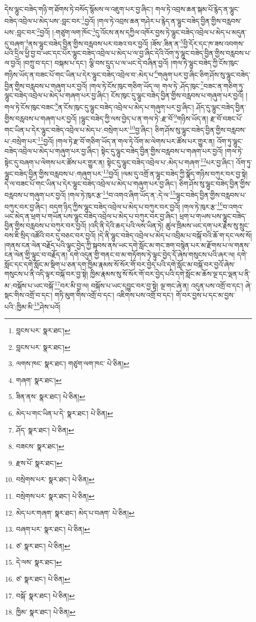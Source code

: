 དེས་ལྷུང་བཟེད་གཉི་ག་ཐོགས་ཏེ་བསོད་སྙོམས་ལ་འཇུག་པར་བྱ་ཞིང་། གལ་ཏེ་འབྲས་ཆན་སྐམ་པོ་རྙེད་ན་ལྷུང་བཟེད་འབྲེལ་པ་མེད་པས་:བླང་བར་\footnote{བླངས་པར་  སྣར་ཐང་། }བྱའོ། །གལ་ཏེ་འབྲས་ཆན་གཤེར་པ་རྙེད་ན་ལྷུང་བཟེད་བྱིན་གྱིས་བརླབས་པས་:བླང་བར་\footnote{བླངས་པར་  སྣར་ཐང་། }བྱའོ། །:གཙུག་ལག་ཁོང་\footnote{ལགས་ཁང་  སྣར་ཐང་། གཙུག་ལག་ཁང་  པེ་ཅིན། }དུ་འོངས་ནས་དཀྱིལ་འཁོར་བྱས་ཏེ་ལྷུང་བཟེད་འབྲེལ་པ་མེད་པ་མདུན་དུ་བཞག་\footnote{གཞག་  སྣར་ཐང་། }ནས་ལྷུང་བཟེད་བྱིན་གྱིས་བརླབས་པར་བཟའ་བར་བྱའོ། །ཟོས་:ཟིན་ན་\footnote{ཟིན་ནས་  སྣར་ཐང་།  པེ་ཅིན། }བྱི་དོར་དང་ཁ་ཟས་འབགས་པའི་དྲིལ་ཕྱི་བྱ་བ་ཡང་དང་པོར་ལྷུང་བཟེད་འབྲེལ་པ་མེད་པ་ལ་བྱ་ཞིང་དེའི་འོག་ཏུ་ལྷུང་བཟེད་བྱིན་གྱིས་བརླབས་པ་ལ་བྱའོ། །བཀྲུ་བ་དང་། བསྐམ་པ་དང་། ལྕི་བས་དྲུད་པ་ལ་ཡང་དེ་བཞིན་བྱའོ། །གལ་ཏེ་ལྷུང་བཟེད་ཀྱི་ངོས་ཁུང་གཉིས་ཡོད་ན་བཟང་པོ་གང་ཡིན་པ་དེར་ལྷུང་བཟེད་འབྲེལ་བ་:མེད་པ་\footnote{མེད་པ་གང་ཡིན་པ་དེ་  སྣར་ཐང་།  པེ་ཅིན། }གཞུག་པར་བྱ་ཞིང་ཅིག་ཤོས་སུ་ལྷུང་བཟེད་བྱིན་གྱིས་བརླབས་པ་གཞུག་པར་བྱའོ། །གལ་ཏེ་ངོས་ཁུང་གཅིག་ཡོད་ལ། གལ་ཏེ་:ཤོད་ཁུང་\footnote{ཤོད་  སྣར་ཐང་།  པེ་ཅིན། }བཟང་ན་གཅིག་ཏུ་ལྷུང་བཟེད་འབྲེལ་པ་མེད་པ་གཞག་པར་བྱ་ཞིང་། ངོས་ཁུང་དུ་ལྷུང་བཟེད་བྱིན་གྱིས་བརླབས་པ་གཞུག་པར་བྱའོ། །གལ་ཏེ་ངོས་ཁུང་བཟང་\footnote{བཟངས་  སྣར་ཐང་། }ན་ངོས་ཁུང་དུ་ལྷུང་བཟེད་འབྲེལ་པ་མེད་པ་གཞུག་པར་བྱ་ཞིང་། ཤོད་དུ་ལྷུང་བཟེད་བྱིན་གྱིས་བརླབས་པ་གཞག་པར་བྱའོ། །ལྷུང་བཟེད་ཀྱི་ལས་བྱེད་པ་ན་གལ་ཏེ་:རྫ་བོ་\footnote{རྫས་པོ་  སྣར་ཐང་། }གཉིས་ཡོད་ན། རྫ་བོ་བཟང་པོ་གང་ཡིན་པ་དེར་ལྷུང་བཟེད་འབྲེལ་པ་མེད་པ་:བསྲེག་པར་\footnote{བསྲེགས་པར་  སྣར་ཐང་།  པེ་ཅིན། }བྱ་ཞིང་། ཅིག་ཤོས་སུ་ལྷུང་བཟེད་བྱིན་གྱིས་བརླབས་པ་:བསྲེག་པར་\footnote{བསྲེགས་པར་  སྣར་ཐང་།  པེ་ཅིན། }བྱའོ། །གལ་ཏེ་རྫ་བོ་གཅིག་ཡོད་ན་གལ་ཏེ་འོག་མ་ལེགས་པར་ཚོས་པར་གྱུར་ན། འོག་ཏུ་ལྷུང་བཟེད་འབྲེལ་པ་མེད་པ་གཞུག་པར་བྱ་ཞིང་། སྟེང་དུ་ལྷུང་བཟེད་བྱིན་གྱིས་བརླབས་པ་གཞག་པར་བྱའོ། །གལ་ཏེ་སྟེང་དུ་བཞག་པ་ལེགས་པར་ཚོས་པར་གྱུར་ན། སྟེང་དུ་ལྷུང་བཟེད་འབྲེལ་པ་:མེད་པ་གཞག་\footnote{མེད་པར་གཞག་  སྣར་ཐང་། མེད་པ་བཞག་  པེ་ཅིན། }པར་བྱ་ཞིང་། འོག་ཏུ་ལྷུང་བཟེད་བྱིན་གྱིས་བརླབས་པ་:གཞུག་པར་\footnote{བཞག་པར་  སྣར་ཐང་།  པེ་ཅིན། }བྱའོ། །ལམ་དུ་འགྲོ་ན་ལྷུང་བཟེད་ཀྱི་སྣོད་གཉིས་བཀུར་བར་བྱ་སྟེ། དེ་ལ་བཟང་པོ་གང་ཡིན་པ་དེར་ལྷུང་བཟེད་འབྲེལ་པ་མེད་པ་གཞུག་པར་བྱ་ཞིང་། ཅིག་ཤོས་སུ་ལྷུང་བཟེད་བྱིན་གྱིས་བརླབས་པ་གཞུག་པར་བྱའོ། །གལ་ཏེ་ཁུར་རྩ་\footnote{ཙ་  སྣར་ཐང་།  པེ་ཅིན། }བ་འགའ་ཞིག་ཡོད་ན་:དེ་ལ་\footnote{དེ་ལས་  སྣར་ཐང་། }ལྷུང་བཟེད་བྱིན་གྱིས་བརླབས་པ་བཀུར་བར་བྱ་ཞིང་། བདག་ཉིད་ཀྱིས་ལྷུང་བཟེད་འབྲེལ་པ་མེད་པ་བཀུར་བར་བྱའོ། །གལ་ཏེ་ཁུར་རྩ་\footnote{ཙ་  སྣར་ཐང་།  པེ་ཅིན། }བ་འགའ་ཡང་མེད་ན་ཕྲག་པ་གཡོན་པས་ལྷུང་བཟེད་འབྲེལ་པ་མེད་པ་བཀུར་བར་བྱ་ཞིང་། ཕྲག་པ་གཡས་པས་ལྷུང་བཟེད་བྱིན་གྱིས་བརླབས་པ་བཀུར་བར་བྱའོ། །འདི་ནི་དེའི་ཆད་པའི་ལས་ཡིན་ཏེ། ཚུལ་ཁྲིམས་ཡང་དག་པར་རྗེས་སུ་སྲུང་བས་ཇི་སྲིད་འཚོའི་བར་དུ་བཅང་བར་བྱའོ། །དེ་ནི་ལྷུང་བཟེད་འབྲེལ་པ་མེད་པ་འབྲིམ་པ་བསྐོ་བའི་ཆོ་ག་དང་ལས་སོ། །གནས་ངན་ལེན་བརྗོད་པའི་ལྟུང་བྱེད་ཀྱི་སྐབས་ནས་ཡང་དགེ་སློང་མ་གང་ཟག་བསྙེན་པར་མ་རྫོགས་པ་ལ་གནས་ངན་ལེན་གྱི་ལྟུང་བ་བརྗོད་ན། དགེ་འདུན་གྱི་གནང་བ་མ་གཏོགས་ཏེ་ལྟུང་བྱེད་དོ་ཞེས་གསུངས་པའི་ཞར་ལ། དགེ་སློང་དང་དགེ་སློང་མ་སྡིག་པ་ཅན་དག་ཁྱིམ་རྣམས་སོ་སོར་གོ་བར་བྱེད་པའི་དགེ་སློང་མ་བསྐོ་བར་བྱའོ་ཞེས་གསུངས་པ་ནི་འདི་ལྟར་བསྐོ་བར་བྱ་སྟེ། ཁྱིམ་རྣམས་སུ་སོ་སོར་གོ་བར་བྱེད་པའི་དགེ་སློང་མ་ཆོས་ལྔ་དང་ལྡན་པ་ནི་མ་:བསྐོས་པ་ཡང་བསྐོ་\footnote{བསྐོ་  སྣར་ཐང་།  པེ་ཅིན། }བར་མི་བྱ་ལ། བསྐོས་པ་ཡང་དབྱུང་བར་བྱ་སྟེ། ལྔ་གང་ཞེ་ན། འདུན་པས་འགྲོ་བ་དང་། ཞེ་སྡང་གིས་འགྲོ་བ་དང་། གཏི་མུག་གིས་འགྲོ་བ་དང་། འཇིགས་པས་འགྲོ་བ་དང་། གོ་བར་བྱས་པ་དང་མ་བྱས་པའི་:ཁྱིམ་མི་\footnote{ཁྱིམ་  སྣར་ཐང་།  པེ་ཅིན། }ཤེས་པའོ། 